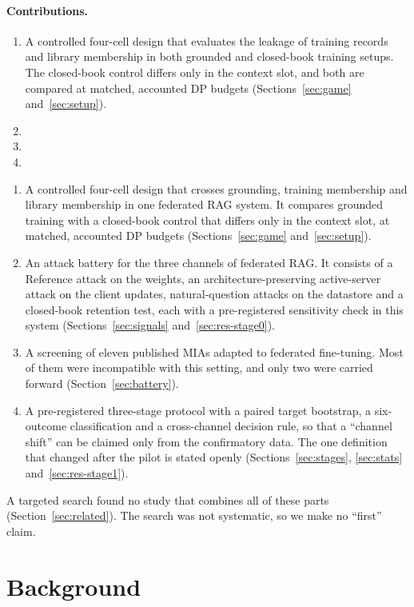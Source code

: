 \documentclass[11pt]{article}
\begin{document}
\paragraph{Contributions.}
\begin{enumerate}
    \item A controlled four-cell design that evaluates the leakage of training records and library membership in both grounded and closed-book training setups. The closed-book control differs only in the context slot, and both are compared at matched, accounted DP budgets (Sections~\ref{sec:game} and~\ref{sec:setup}).
    \item 
    \item 
    \item 
\end{enumerate}
\begin{enumerate}
  \item A controlled four-cell design that crosses grounding, training membership and library membership in one federated RAG system. It compares grounded training with a closed-book control that differs only in the context slot, at matched, accounted DP budgets (Sections~\ref{sec:game} and~\ref{sec:setup}).
  \item An attack battery for the three channels of federated RAG. It consists of a Reference attack on the weights, an architecture-preserving active-server attack on the client updates, natural-question attacks on the datastore and a closed-book retention test, each with a pre-registered sensitivity check in this system (Sections~\ref{sec:signals} and~\ref{sec:res-stage0}).
  \item A screening of eleven published MIAs adapted to federated fine-tuning. Most of them were incompatible with this setting, and only two were carried forward (Section~\ref{sec:battery}).
  \item A pre-registered three-stage protocol with a paired target bootstrap, a six-outcome classification and a cross-channel decision rule, so that a ``channel shift'' can be claimed only from the confirmatory data. The one definition that changed after the pilot is stated openly (Sections~\ref{sec:stages}, \ref{sec:stats} and~\ref{sec:res-stage1}).
\end{enumerate}
A targeted search found no study that combines all of these parts (Section~\ref{sec:related}). The search was not systematic, so we make no ``first'' claim.

\section{Background}
\end{document}
